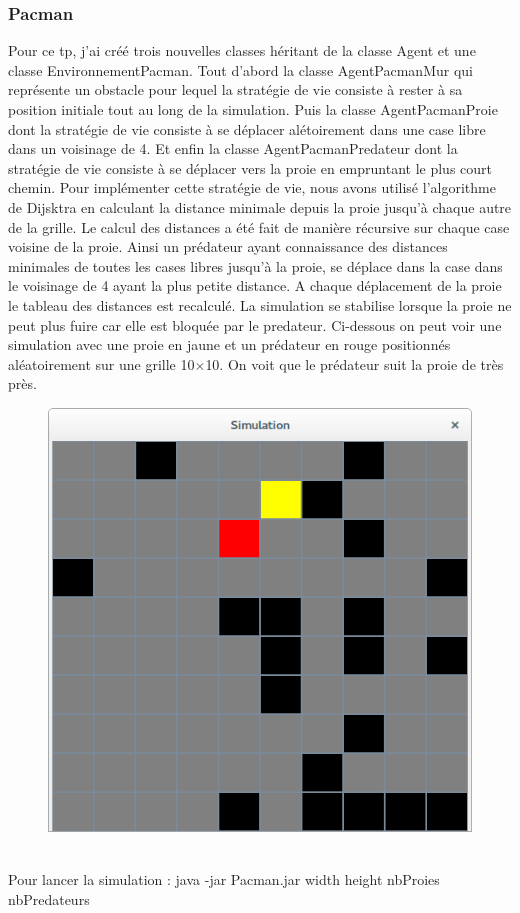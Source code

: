\documentclass[a4paper,12pt]{report}
\begin{document}
\subsubsection*{Pacman}
Pour ce tp, j'ai créé trois nouvelles classes héritant de la classe Agent et une classe EnvironnementPacman. Tout d'abord la classe AgentPacmanMur qui représente un obstacle pour lequel la stratégie de vie consiste à rester à sa position initiale tout au long de la simulation. Puis la classe AgentPacmanProie dont la stratégie de vie consiste à se déplacer alétoirement dans une case libre dans un voisinage de 4. Et enfin la classe AgentPacmanPredateur dont la stratégie de vie consiste à se déplacer vers la proie en empruntant le plus court chemin. Pour implémenter cette stratégie de vie, nous avons utilisé l'algorithme de Dijsktra en calculant la distance minimale depuis la proie jusqu'à chaque autre de la grille. Le calcul des distances a été fait de manière récursive sur chaque case voisine de la proie. Ainsi un prédateur ayant connaissance des distances minimales de toutes les cases libres jusqu'à la proie, se déplace dans la case dans le voisinage de 4 ayant la plus petite distance. A chaque déplacement de la proie le tableau des distances est recalculé. La simulation se stabilise lorsque la proie ne peut plus fuire car elle est bloquée par le predateur. Ci-dessous on peut voir une simulation avec une proie en jaune et un prédateur en rouge positionnés aléatoirement sur une grille 10$\times$10. On voit que le prédateur suit la proie de très près.\\
\begin{figure}[!ht]
	\center
	\includegraphics[scale=0.5]{./pacman.png}
\end{figure}\\
\noindent Pour lancer la simulation : java -jar Pacman.jar width height nbProies nbPredateurs
\end{document}
